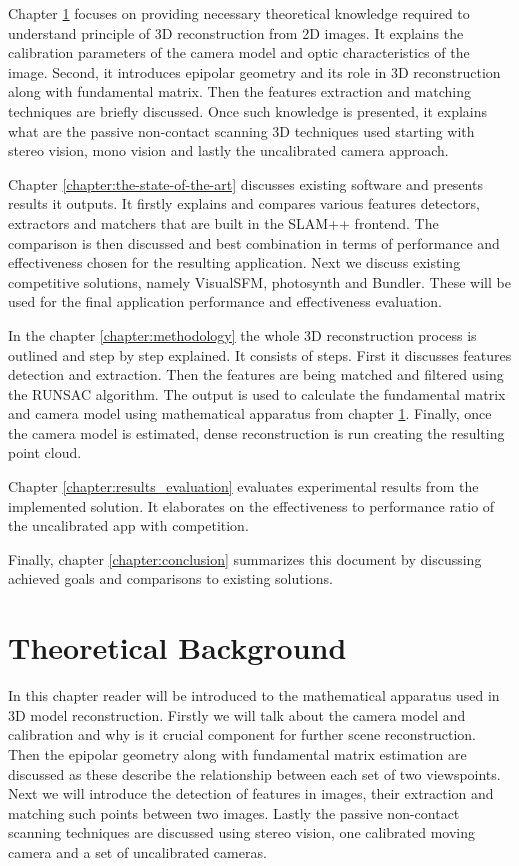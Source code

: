 Chapter \ref{chapter:theoretical-background} focuses on providing necessary theoretical knowledge required to understand principle of 3D reconstruction from 2D images. It explains the calibration parameters of the camera model and optic characteristics of the image. Second, it introduces epipolar geometry and its role in 3D reconstruction along with fundamental matrix. Then the features extraction and matching techniques are briefly discussed. Once such knowledge is presented, it explains what are the passive non-contact scanning 3D techniques used starting with stereo vision, mono vision and lastly the uncalibrated camera approach.

Chapter \ref{chapter:the-state-of-the-art} discusses existing software and presents results it outputs. It firstly explains and compares various features detectors, extractors and matchers that are built in the SLAM++ frontend. The comparison is then discussed and best combination in terms of performance and effectiveness chosen for the resulting application. Next we discuss existing competitive solutions, namely VisualSFM, photosynth and Bundler. These will be used for the final application performance and effectiveness evaluation.

In the chapter \ref{chapter:methodology} the whole 3D reconstruction process is outlined and step by step explained. It consists of steps. First it discusses features detection and extraction. Then the features are being matched and filtered using the RUNSAC algorithm. The output is used to calculate the fundamental matrix and camera model using mathematical apparatus from chapter \ref{chapter:theoretical-background}. Finally, once the camera model is estimated, dense reconstruction is run creating the resulting point cloud.

Chapter \ref{chapter:results_evaluation} evaluates experimental results from the implemented solution. It elaborates on  the effectiveness to performance ratio of the uncalibrated app with competition.

Finally, chapter \ref{chapter:conclusion} summarizes this document by discussing achieved goals and comparisons to existing solutions.

\chapter{Theoretical Background}
\label{chapter:theoretical-background}
In this chapter reader will be introduced to the mathematical apparatus used in 3D model reconstruction. Firstly we will talk about the camera model and calibration and why is it crucial component for further scene reconstruction. Then the epipolar geometry along with fundamental matrix estimation are discussed as these describe the relationship between each set of two viewspoints. Next we will introduce the detection of features in images, their extraction and matching such points between two images. Lastly the passive non-contact scanning techniques are discussed using stereo vision, one calibrated moving camera and a set of uncalibrated cameras.
